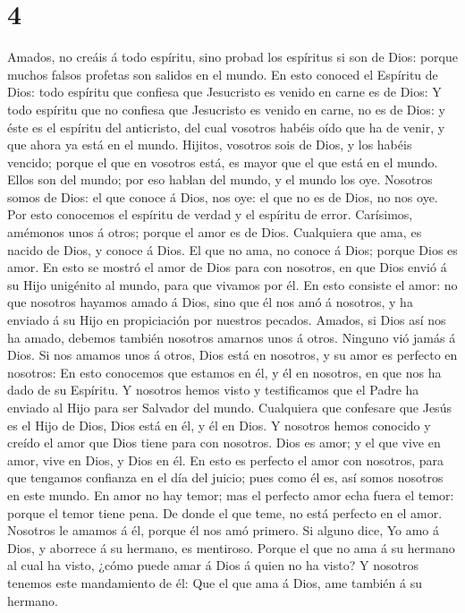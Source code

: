 \hypertarget{section-3}{%
\section{4}\label{section-3}}

 Amados, no creáis á todo espíritu, sino probad los
espíritus si son de Dios: porque muchos falsos profetas son salidos en
el mundo.  En esto conoced el Espíritu de Dios: todo
espíritu que confiesa que Jesucristo es venido en carne es de Dios:
 Y todo espíritu que no confiesa que Jesucristo es venido
en carne, no es de Dios: y éste es el espíritu del anticristo, del cual
vosotros habéis oído que ha de venir, y que ahora ya está en el mundo.
 Hijitos, vosotros sois de Dios, y los habéis vencido;
porque el que en vosotros está, es mayor que el que está en el mundo.
 Ellos son del mundo; por eso hablan del mundo, y el mundo
los oye.  Nosotros somos de Dios: el que conoce á Dios,
nos oye: el que no es de Dios, no nos oye. Por esto conocemos el
espíritu de verdad y el espíritu de error.  Carísimos,
amémonos unos á otros; porque el amor es de Dios. Cualquiera que ama, es
nacido de Dios, y conoce á Dios.  El que no ama, no conoce
á Dios; porque Dios es amor.  En esto se mostró el amor de
Dios para con nosotros, en que Dios envió á su Hijo unigénito al mundo,
para que vivamos por él.  En esto consiste el amor: no
que nosotros hayamos amado á Dios, sino que él nos amó á nosotros, y ha
enviado á su Hijo en propiciación por nuestros pecados. 
Amados, si Dios así nos ha amado, debemos también nosotros amarnos unos
á otros.  Ninguno vió jamás á Dios. Si nos amamos unos á
otros, Dios está en nosotros, y su amor es perfecto en nosotros:
 En esto conocemos que estamos en él, y él en nosotros,
en que nos ha dado de su Espíritu.  Y nosotros hemos
visto y testificamos que el Padre ha enviado al Hijo para ser Salvador
del mundo.  Cualquiera que confesare que Jesús es el Hijo
de Dios, Dios está en él, y él en Dios.  Y nosotros hemos
conocido y creído el amor que Dios tiene para con nosotros. Dios es
amor; y el que vive en amor, vive en Dios, y Dios en él. 
En esto es perfecto el amor con nosotros, para que tengamos confianza en
el día del juicio; pues como él es, así somos nosotros en este mundo.
 En amor no hay temor; mas el perfecto amor echa fuera el
temor: porque el temor tiene pena. De donde el que teme, no está
perfecto en el amor.  Nosotros le amamos á él, porque él
nos amó primero.  Si alguno dice, Yo amo á Dios, y
aborrece á su hermano, es mentiroso. Porque el que no ama á su hermano
al cual ha visto, ¿cómo puede amar á Dios á quien no ha visto?
 Y nosotros tenemos este mandamiento de él: Que el que
ama á Dios, ame también á su hermano.

